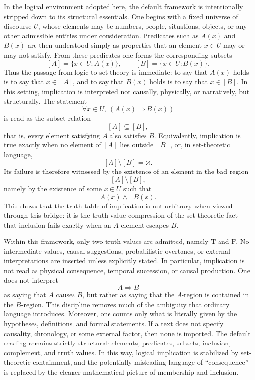 \documentclass{article}
\begin{document}
	In the logical environment adopted here, the default framework is intentionally stripped down to its structural essentials. One begins with a fixed universe of discourse \(U\), whose elements may be numbers, people, situations, objects, or any other admissible entities under consideration. Predicates such as \(A(x)\) and \(B(x)\) are then understood simply as properties that an element \(x\in U\) may or may not satisfy. From these predicates one forms the corresponding subsets
	\[
	[A]=\{x\in U:A(x)\},
	\qquad
	[B]=\{x\in U:B(x)\}.
	\]
	Thus the passage from logic to set theory is immediate: to say that \(A(x)\) holds is to say that \(x\in[A]\), and to say that \(B(x)\) holds is to say that \(x\in[B]\). In this setting, implication is interpreted not causally, physically, or narratively, but structurally. The statement
	\[
	\forall x\in U,\; (A(x)\Rightarrow B(x))
	\]
	is read as the subset relation
	\[
	[A]\subseteq[B],
	\]
	that is, every element satisfying \(A\) also satisfies \(B\). Equivalently, implication is true exactly when no element of \([A]\) lies outside \([B]\), or, in set-theoretic language,
	\[
	[A]\setminus[B]=\varnothing.
	\]
	Its failure is therefore witnessed by the existence of an element in the bad region
	\[
	[A]\setminus[B],
	\]
	namely by the existence of some \(x\in U\) such that
	\[
	A(x)\land \neg B(x).
	\]
	This shows that the truth table of implication is not arbitrary when viewed through this bridge: it is the truth-value compression of the set-theoretic fact that inclusion fails exactly when an \(A\)-element escapes \(B\).
	
	Within this framework, only two truth values are admitted, namely \(\mathrm{T}\) and \(\mathrm{F}\). No intermediate values, causal suggestions, probabilistic overtones, or external interpretations are inserted unless explicitly stated. In particular, implication is not read as physical consequence, temporal succession, or causal production. One does not interpret
	\[
	A\Rightarrow B
	\]
	as saying that \(A\) causes \(B\), but rather as saying that the \(A\)-region is contained in the \(B\)-region. This discipline removes much of the ambiguity that ordinary language introduces. Moreover, one counts only what is literally given by the hypotheses, definitions, and formal statements. If a text does not specify causality, chronology, or some external factor, then none is imported. The default reading remains strictly structural: elements, predicates, subsets, inclusion, complement, and truth values. In this way, logical implication is stabilized by set-theoretic containment, and the potentially misleading language of “consequence” is replaced by the cleaner mathematical picture of membership and inclusion.
	
\end{document}
